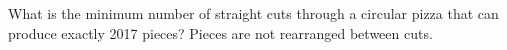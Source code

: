 What is the minimum number of straight cuts through a circular pizza that can produce exactly 2017 pieces? Pieces are not rearranged between cuts.
